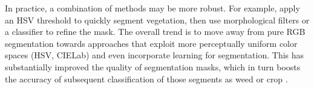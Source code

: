 \documentclass[letterpaper, notitlepage]{report}
\begin{document}
%
In practice, a combination of methods may be more robust. For example, apply an HSV threshold to quickly segment vegetation, then use morphological filters or a classifier to refine the mask. The overall trend  is to move away from pure RGB segmentation towards approaches that exploit more perceptually uniform color spaces (HSV, CIELab) and even incorporate learning for segmentation. This has substantially improved the quality of segmentation masks, which in turn boosts the accuracy of subsequent classification of those segments as weed or crop  \parencite{Wu2021-gt}.
%
\end{document}
